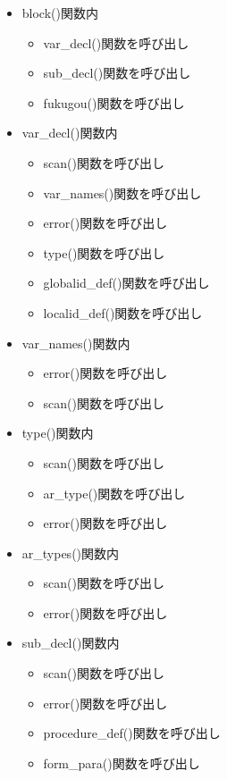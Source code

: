 \documentclass{jarticle}
\begin{document}
\begin{itemize}
\begin{itemize}
\begin{itemize}
    \end{itemize}
    \item block()関数内
    \begin{itemize}
      \item var\_decl()関数を呼び出し
      \item sub\_decl()関数を呼び出し
      \item fukugou()関数を呼び出し
    \end{itemize}
    \item var\_decl()関数内
    \begin{itemize}
      \item scan()関数を呼び出し
      \item var\_names()関数を呼び出し
      \item  error()関数を呼び出し
      \item type()関数を呼び出し
      \item globalid\_def()関数を呼び出し
      \item localid\_def()関数を呼び出し
    \end{itemize}
    \item var\_names()関数内
    \begin{itemize}
      \item error()関数を呼び出し
      \item scan()関数を呼び出し
    \end{itemize}
    \item type()関数内
    \begin{itemize}
      \item scan()関数を呼び出し
      \item ar\_type()関数を呼び出し
      \item error()関数を呼び出し
    \end{itemize}
    \item ar\_types()関数内
    \begin{itemize}
      \item scan()関数を呼び出し
      \item error()関数を呼び出し
    \end{itemize}
    \item sub\_decl()関数内
    \begin{itemize}
      \item scan()関数を呼び出し
      \item error()関数を呼び出し
      \item procedure\_def()関数を呼び出し
      \item form\_para()関数を呼び出し

\end{itemize}
\end{itemize}
\end{itemize}
\end{document}
